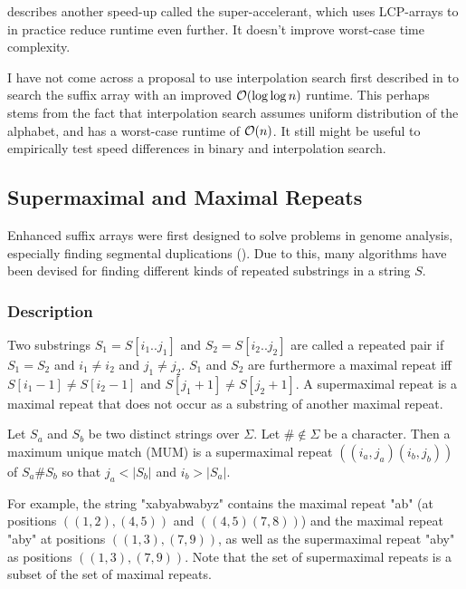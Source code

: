 \documentclass[a4paper,10pt]{article}
\begin{document}
\citealt[p. 152]{gusfield1997algorithms} describes another speed-up
called the super-accelerant, which uses LCP-arrays to in practice reduce
runtime even further. It doesn't improve worst-case time complexity.


I have not come across a proposal to use interpolation search first
described in \citealt{perl1978interpolation} to search the suffix array
with an improved ${\cal{O}}(\log \log n)$ runtime. This perhaps stems
from the fact that interpolation search assumes uniform distribution of
the alphabet, and has a worst-case runtime of ${\cal{O}}(n)$. It still
might be useful to empirically test speed differences in binary and
interpolation search.

\subsection*{Supermaximal and Maximal Repeats}

Enhanced suffix arrays were first designed to solve problems
in genome analysis, especially finding segmental duplications
(\citealt{lander2001initial}). Due to this, many algorithms have been
devised for finding different kinds of repeated substrings in a string
$S$.

\subsubsection*{Description}

Two substrings $S_1=S[i_1..j_1]$ and $S_2=S[i_2..j_2]$ are called a
repeated pair if $S_1=S_2$ and $i_1 \ne i_2$ and $j_1 \ne j_2$.  $S_1$
and $S_2$ are furthermore a maximal repeat iff $S[i_1-1] \ne S[i_2-1]$
and $S[j_1+1] \ne S[j_2+1]$. A supermaximal repeat is a maximal repeat
that does not occur as a substring of another maximal repeat.

Let $S_a$ and $S_b$ be two distinct strings over $\Sigma$. Let $\#
\not \in \Sigma$ be a character. Then a maximum unique match (MUM) is
a supermaximal repeat $((i_a, j_a)(i_b, j_b))$ of $S_a\#S_b$ so that
$j_a<|S_b|$ and $i_b>|S_a|$.

For example, the string "xabyabwabyz" contains the maximal repeat "ab"
(at positions $((1,2),(4,5))$ and $((4,5)(7,8))$) and the maximal repeat
"aby" at positions $((1,3),(7,9))$, as well as the supermaximal repeat
"aby" as positions $((1,3),(7,9))$. Note that the set of supermaximal
repeats is a subset of the set of maximal repeats.
\end{document}
